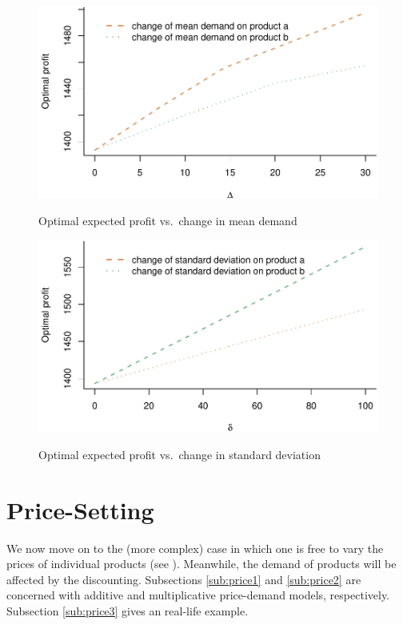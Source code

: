 \documentclass[a4paper,11pt]{article}
\begin{document}
\begin{figure}[htb]
\centering
\caption{Optimal expected profit vs.\ change in mean demand}
\includegraphics{Example-figure_files/figure-latex/mean-1.pdf}
\label{fig:simple1}
\end{figure}

\begin{figure}[htb]
\centering
\caption{Optimal expected profit vs.\ change in standard deviation}
\includegraphics{Example-figure_files/figure-latex/var-1.pdf}
\label{fig:simple2}
\end{figure}

\section{Price-Setting}
\label{se:price}

We now move on to the (more complex) case in which one is free to vary the prices of individual products (see \cite{De20}). Meanwhile, the demand of products will be affected by the discounting. Subsections \ref{sub:price1} and \ref{sub:price2} are concerned with additive and multiplicative price-demand models, respectively. Subsection \ref{sub:price3} gives an real-life example.
\end{document}
